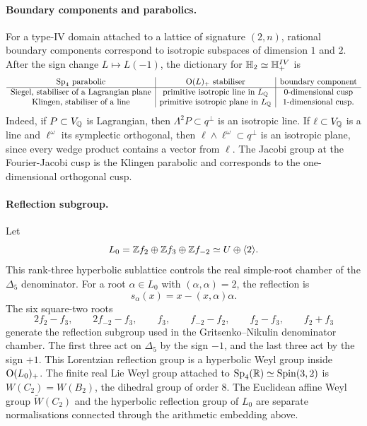 \paragraph{Boundary components and parabolics.}
For a type-IV domain attached to a lattice of signature \((2,n)\),
rational boundary components correspond to isotropic subspaces of
dimension \(1\) and \(2\).  After the sign change \(L\mapsto L(-1)\),
the dictionary for \(\mathbb{H}_2\simeq\mathbb{H}^{IV}_+\) is
\[
\begin{array}{c|c|c}
\mathrm{Sp}_4\text{ parabolic} & \mathrm{O}(L)_+\text{ stabiliser} & \text{boundary component}\\ \hline
\text{Siegel, stabiliser of a Lagrangian plane}
& \text{primitive isotropic line in }L_{\mathbb{Q}}
& 0\text{-dimensional cusp}\\
\text{Klingen, stabiliser of a line}
& \text{primitive isotropic plane in }L_{\mathbb{Q}}
& 1\text{-dimensional cusp}.
\end{array}
\]
Indeed, if \(P\subset V_{\mathbb{Q}}\) is Lagrangian, then
\(\Lambda^2P\subset q^\perp\) is an isotropic line.  If
\(\ell\subset V_{\mathbb{Q}}\) is a line and \(\ell^\omega\) its symplectic
orthogonal, then \(\ell\wedge\ell^\omega\subset q^\perp\) is an
isotropic plane, since every wedge product contains a vector from
\(\ell\).  The Jacobi group at the Fourier-Jacobi cusp is the Klingen
parabolic and corresponds to the one-dimensional orthogonal cusp.

\paragraph{Reflection subgroup.}
Let
\[
  L_0=\mathbb{Z} f_2\oplus\mathbb{Z} f_3\oplus\mathbb{Z} f_{-2}\simeq U\oplus\langle 2\rangle.
\]
This rank-three hyperbolic sublattice controls the real simple-root
chamber of the \(\Delta_5\) denominator.  For a root
\(\alpha\in L_0\) with \((\alpha,\alpha)=2\), the reflection is
\[
  s_\alpha(x)=x-(x,\alpha)\alpha.
\]
The six square-two roots
\[
  2f_2-f_3,\qquad 2f_{-2}-f_3,\qquad f_3,\qquad
  f_{-2}-f_2,\qquad f_2-f_3,\qquad f_2+f_3
\]
generate the reflection subgroup used in the Gritsenko--Nikulin
denominator chamber.  The first three act on \(\Delta_5\) by the sign
\(-1\), and the last three act by the sign \(+1\).  This Lorentzian
reflection group is a hyperbolic Weyl group inside \(\mathrm{O}(L_0)_+\).  The
finite real Lie Weyl group attached to
\(\mathrm{Sp}_4(\mathbb{R})\simeq\mathrm{Spin}(3,2)\) is \(W(C_2)=W(B_2)\), the dihedral group
of order \(8\).  The Euclidean affine Weyl group \(\widetilde W(C_2)\)
and the hyperbolic reflection group of \(L_0\) are separate
normalisations connected through the arithmetic embedding above.

